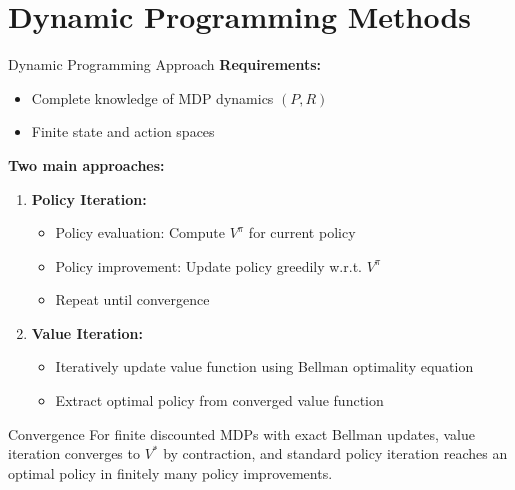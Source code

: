 \documentclass[aspectratio=169]{beamer}
\begin{document}
\section{Dynamic Programming Methods}

\begin{frame}{Dynamic Programming Approach}
  \textbf{Requirements:}
  \begin{itemize}
    \item Complete knowledge of MDP dynamics $(P, R)$
    \item Finite state and action spaces
  \end{itemize}

  \vspace{0.5em}

  \textbf{Two main approaches:}
  \begin{enumerate}
    \item \textbf{Policy Iteration:}
    \begin{itemize}
      \item Policy evaluation: Compute $V^\pi$ for current policy
      \item Policy improvement: Update policy greedily w.r.t. $V^\pi$
      \item Repeat until convergence
    \end{itemize}

    \item \textbf{Value Iteration:}
    \begin{itemize}
      \item Iteratively update value function using Bellman optimality equation
      \item Extract optimal policy from converged value function
    \end{itemize}
  \end{enumerate}

  \vspace{0.5em}

  \begin{theorembox}{Convergence}
    For finite discounted MDPs with exact Bellman updates, value iteration converges to $V^*$ by contraction, and standard policy iteration reaches an optimal policy in finitely many policy improvements.
  \end{theorembox}
\end{frame}
\end{document}
